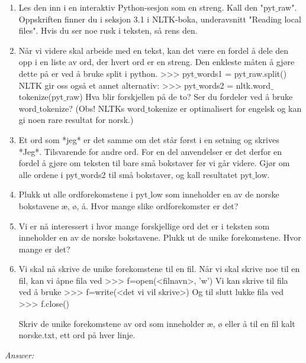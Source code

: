 \documentclass[a4paper, 12pt,]{article}             %
\begin{document}
\begin{enumerate}
\item  Les den inn i en interaktiv Python-sesjon som en streng. Kall den "pyt$\_$raw". Oppskriften finner du i 
seksjon 3.1 i NLTK-boka, underavsnitt "Reading local files". Hvis du ser noe rusk i teksten, så rens den. 
\item Når vi videre skal arbeide med en tekst, kan det være en fordel å dele den opp i en liste av ord, der 
hvert ord er en streng. Den enkleste måten å gjøre dette på er ved å bruke split i python. 
>>> pyt$\_$words1 = pyt$\_$raw.split() 
NLTK gir oss også et annet alternativ: 
>>> pyt$\_$words2 = nltk.word$\_$tokenize(pyt$\_$raw) 
Hva blir forskjellen på de to? Ser du fordeler ved å bruke word$\_$tokenize? (Obs! NLTKs word$\_$tokenize 
er optimalisert for engelsk og kan gi noen rare resultat for norsk.) 
\item Et ord som *jeg* er det samme om det står først i en setning og skrives *Jeg*. Tilsvarende for andre 
ord. For en del anvendelser er det derfor en fordel å gjøre om teksten til bare små bokstaver før vi 
går videre. Gjør om alle ordene i pyt$\_$words2 til små bokstaver, og kall resultatet pyt$\_$low. 
\item Plukk ut alle ordforekomstene i pyt$\_$low som inneholder en av de norske bokstavene æ, ø, å. Hvor 
mange slike ordforekomster er det? 
\item  Vi er nå interessert i hvor mange forskjellige ord det er i teksten som inneholder en av de norske 
bokstavene. Plukk ut de unike forekomstene. Hvor mange er det? 
\item Vi skal nå skrive de unike forekomstene til en fil. Når vi skal skrive noe til en fil, kan vi åpne fila ved 
>>> f=open(<filnavn>, 'w') 
Vi kan skrive til fila ved å bruke 
>>> f=write(<det vi vil skrive>) 
Og til slutt lukke fila ved  
>>> f.close() 
 
Skriv de unike forekomstene av ord som inneholder æ, ø eller å til en fil kalt norske.txt, ett ord på 
hver linje.
\end{enumerate}

\textit{Answer:}
\end{document}
